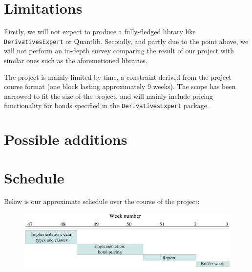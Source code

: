 \documentclass[11pt]{article}
\begin{document}
\section*{Limitations}

Firstly, we will not expect to produce a fully-fledged library like {\tt DerivativesExpert} or Quantlib\cite{Ame2003}.
Secondly, and partly due to the point above, we will not perform an in-depth survey
comparing the result of our project with similar ones such as the aforemetioned libraries.


The project is mainly limited by time, a constraint derived from the project course 
format (one block lasting approximately 9 weeks).
The scope has been narrowed to fit the size of the project, and will mainly include
pricing functionality for bonds specified in the {\tt DerivativesExpert} package.

\section*{Possible additions}

\section*{Schedule}

Below is our approximate schedule over the course of the project:\\

\begin{figure}[h!]
\begin{center}
\includegraphics[scale=0.275]{schedule.png}
\end{center}
\end{figure}



\end{document}

